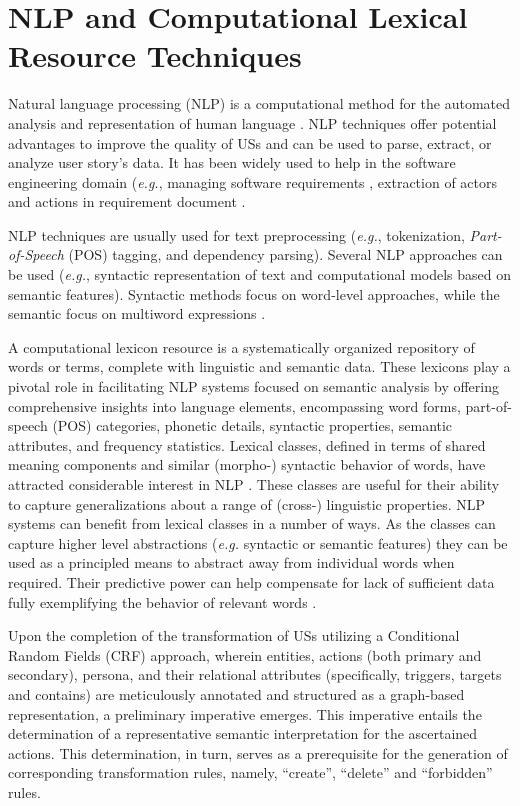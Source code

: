 \section{NLP and Computational Lexical Resource Techniques}\label{nlp}
Natural language processing (NLP) is a computational method for the automated analysis and representation of human language \cite{cambria2014jumping}. NLP techniques offer potential advantages to improve the quality of USs and can be used to parse, extract, or analyze user story's data. It has been widely used to help in the software engineering domain (\emph{e.g.}, managing software requirements \cite{Arias2018}, extraction of actors and actions in requirement document \cite{al2018use}.

NLP techniques are usually used for text preprocessing (\emph{e.g.}, tokenization, \emph{Part-of-Speech} (POS) tagging, and dependency parsing). Several NLP approaches can be used (\emph{e.g.}, syntactic representation of text and computational models based on semantic features). Syntactic methods focus on word-level approaches, while the semantic focus on multiword expressions \cite{cambria2014jumping}.

A computational lexicon resource is a systematically organized repository of words or terms, complete with linguistic and semantic data. These lexicons play a pivotal role in facilitating NLP systems focused on semantic analysis by offering comprehensive insights into language elements, encompassing word forms, part-of-speech (POS) categories, phonetic details, syntactic properties, semantic attributes, and frequency statistics. Lexical classes, defined in terms of shared meaning components and similar (morpho-) syntactic behavior of words, have attracted considerable interest in NLP \cite{cambria2014jumping}. These classes are useful for their ability to capture generalizations about a range of (cross-) linguistic properties. NLP systems can benefit from lexical classes in a number of ways. As the classes can capture higher level abstractions (\emph{e.g.} syntactic or semantic features) they can be used as a principled means to abstract away from individual words when required. Their predictive power can help compensate for lack of sufficient data fully exemplifying the behavior of relevant words \cite{kipper2006extending}.

Upon the completion of the transformation of USs utilizing a Conditional Random Fields (CRF) approach, wherein entities, actions (both primary and secondary), persona, and their relational attributes (specifically, triggers, targets and contains) are meticulously annotated and structured as a graph-based representation, a preliminary imperative emerges. This imperative entails the determination of a representative semantic interpretation for the ascertained actions. This determination, in turn, serves as a prerequisite for the generation of corresponding transformation rules, namely, \enquote{create}, \enquote{delete} and \enquote{forbidden} rules.

